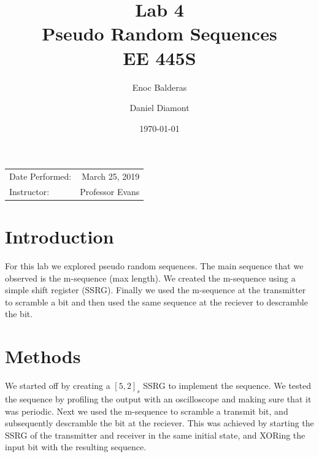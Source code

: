 \documentclass{article}
\title{Lab 4\\ Pseudo Random Sequences\\ EE 445S} %
\author{Enoc Balderas\\
        \and
        Daniel Diamont\\} %
\date{\today} %
\begin{document}
\maketitle %

\begin{center}
\begin{tabular}{l r}
Date Performed: & March 25, 2019 \\ %
Instructor: & Professor Evans %
\end{tabular}
\end{center}



\section{Introduction}

For this lab we explored pseudo random sequences. The main sequence that we
observed is the m-sequence (max length). We created the m-sequence using a
simple shift register (SSRG). Finally we used the m-sequence at the transmitter
to scramble a bit and then used the same sequence at the reciever to descramble
the bit.


\section{Methods}

We started off by creating a $[5, 2]_s$ SSRG to implement the sequence. We tested
the sequence by profiling the output with an oscilloscope and making sure that
it was periodic. Next we used the m-sequence to scramble a transmit bit, and
subsequently descramble the bit at the reciever. This was achieved by starting
the SSRG of the transmitter and receiver in the same initial state, and XORing
the input bit with the resulting sequence.
 
\end{document}
